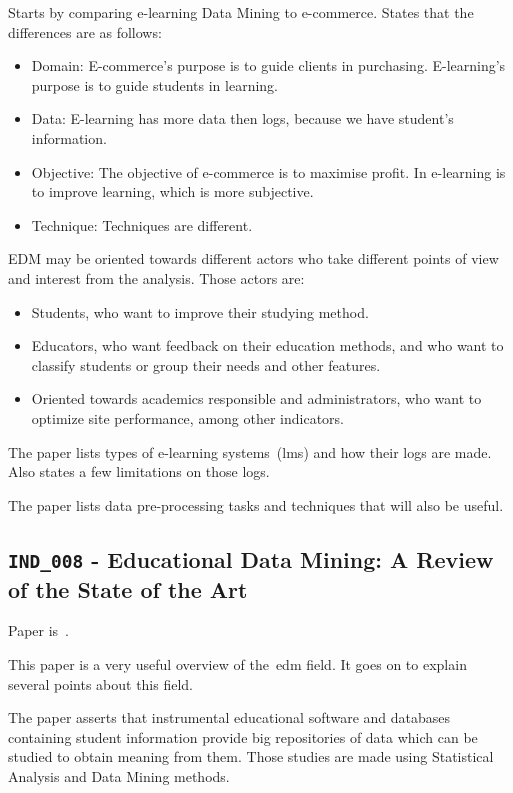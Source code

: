 Starts by comparing e-learning Data Mining to e-commerce. States that the
differences are as follows:

\begin{itemize}
    \item Domain: E-commerce's purpose is to guide clients in purchasing.
        E-learning's purpose is to guide students in learning.
    \item Data: E-learning has more data then logs, because we have student's
        information.
    \item Objective: The objective of e-commerce is to maximise profit. In
        e-learning is to improve learning, which is more subjective.
    \item Technique: Techniques are different.
\end{itemize}

EDM may be oriented towards different actors who take different points of view
and interest from the analysis. Those actors are:

\begin{itemize}
    \item Students, who want to improve their studying method.
    \item Educators, who want feedback on their education methods, and who want
        to classify students or group their needs and other features.
    \item Oriented towards academics responsible and administrators, who want
        to optimize site performance, among other indicators.
\end{itemize}

The paper lists types of e-learning systems~(\gls{lms}) and how their logs are
made. Also states a few limitations on those logs.

The paper lists data pre-processing tasks and techniques that will also be
useful.

\subsection{\texttt{IND\_008} - Educational Data Mining: A Review of the State
of the Art}

Paper is~\cite{ind_008}.

This paper is a very useful overview of the~\gls{edm} field. It goes on to
explain several points about this field.

The paper asserts that instrumental educational software and databases
containing student information provide big repositories of data which can be
studied to obtain meaning from them. Those studies are made using Statistical
Analysis and Data Mining methods.

